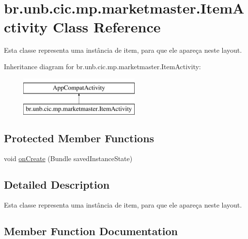 \hypertarget{classbr_1_1unb_1_1cic_1_1mp_1_1marketmaster_1_1ItemActivity}{}\section{br.\+unb.\+cic.\+mp.\+marketmaster.\+Item\+Activity Class Reference}
\label{classbr_1_1unb_1_1cic_1_1mp_1_1marketmaster_1_1ItemActivity}


Esta classe representa uma instância de item, para que ele apareça neste layout.  


Inheritance diagram for br.\+unb.\+cic.\+mp.\+marketmaster.\+Item\+Activity\+:\begin{figure}[H]
\begin{center}
\leavevmode
\includegraphics[height=2.000000cm]{classbr_1_1unb_1_1cic_1_1mp_1_1marketmaster_1_1ItemActivity}
\end{center}
\end{figure}
\subsection*{Protected Member Functions}
\begin{DoxyCompactItemize}
\item 
void \mbox{\hyperlink{classbr_1_1unb_1_1cic_1_1mp_1_1marketmaster_1_1ItemActivity_ae98a8030b874b28e8954d434729ee84f}{on\+Create}} (Bundle saved\+Instance\+State)
\end{DoxyCompactItemize}


\subsection{Detailed Description}
Esta classe representa uma instância de item, para que ele apareça neste layout. 

\subsection{Member Function Documentation}
\mbox{\label{classbr_1_1unb_1_1cic_1_1mp_1_1marketmaster_1_1ItemActivity_ae98a8030b874b28e8954d434729ee84f}} 
